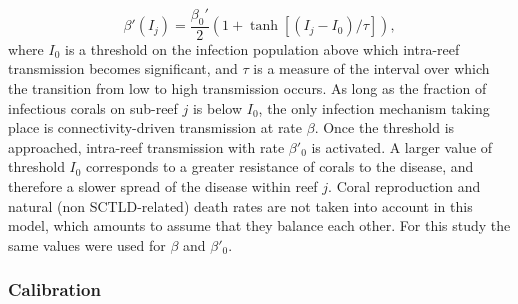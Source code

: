 \begin{equation}
    \beta'(I_j) = \dfrac{\beta_0'}{2}(1+\tanh[(I_j-I_0)/\tau]),\label{eq:beta}
\end{equation}
where $I_0$ is a threshold on the infection population above which intra-reef transmission becomes significant, and $\tau$ is a measure of the interval over which the transition from low to high transmission occurs. As long as the fraction of infectious corals on sub-reef $j$ is below $I_0$, the only infection mechanism taking place is connectivity-driven transmission at rate $\beta$. Once the threshold is approached, intra-reef transmission with rate $\beta'_0$ is activated. A larger value of threshold $I_0$ corresponds to a greater resistance of corals to the disease, and therefore a slower spread of the disease within reef $j$. Coral reproduction and natural (\ie non SCTLD-related) death rates are not taken into account in this model, which amounts to assume that they balance each other. For this study the same values were used for $\beta$ and $\beta'_0$.

\subsubsection{Calibration}

